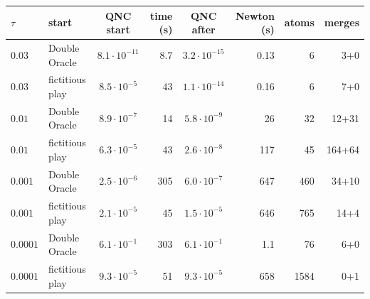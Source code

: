 \begin{tabular}{llcrcrrr}
\toprule
$\tau$ & start & QNC start & time (s) & QNC after & Newton (s) & atoms & merges \\
\midrule
$0.03$ & Double Oracle & $8.1\cdot10^{-11}$ & 8.7 & $3.2\cdot10^{-15}$ & 0.13 & 6 & 3+0 \\
$0.03$ & fictitious play & $8.5\cdot10^{-5}$ & 43 & $1.1\cdot10^{-14}$ & 0.16 & 6 & 7+0 \\
$0.01$ & Double Oracle & $8.9\cdot10^{-7}$ & 14 & $5.8\cdot10^{-9}$ & 26 & 32 & 12+31 \\
$0.01$ & fictitious play & $6.3\cdot10^{-5}$ & 43 & $2.6\cdot10^{-8}$ & 117 & 45 & 164+64 \\
$0.001$ & Double Oracle & $2.5\cdot10^{-6}$ & 305 & $6.0\cdot10^{-7}$ & 647 & 460 & 34+10 \\
$0.001$ & fictitious play & $2.1\cdot10^{-5}$ & 45 & $1.5\cdot10^{-5}$ & 646 & 765 & 14+4 \\
$0.0001$ & Double Oracle & $6.1\cdot10^{-1}$ & 303 & $6.1\cdot10^{-1}$ & 1.1 & 76 & 6+0 \\
$0.0001$ & fictitious play & $9.3\cdot10^{-5}$ & 51 & $9.3\cdot10^{-5}$ & 658 & 1584 & 0+1 \\
\bottomrule
\end{tabular}
